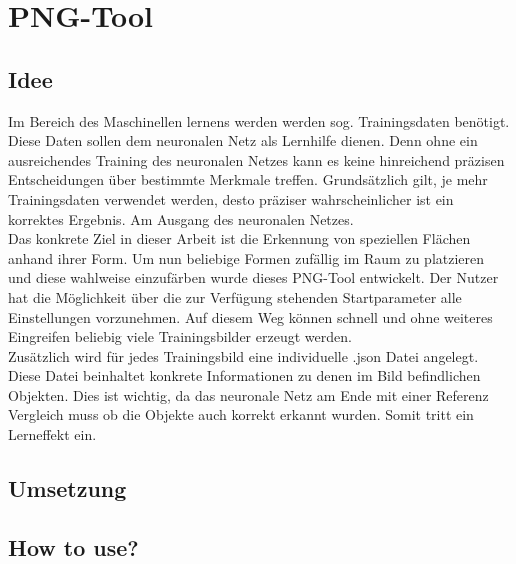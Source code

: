 
\section{PNG-Tool}

\subsection{Idee}

Im Bereich des Maschinellen lernens werden werden sog. Trainingsdaten benötigt. Diese Daten sollen dem neuronalen Netz als Lernhilfe dienen. Denn ohne ein ausreichendes Training des neuronalen Netzes kann es keine hinreichend präzisen Entscheidungen über bestimmte Merkmale treffen.
Grundsätzlich gilt, je mehr Trainingsdaten verwendet werden, desto präziser wahrscheinlicher ist ein korrektes Ergebnis. Am Ausgang des neuronalen Netzes. \\

Das konkrete Ziel in dieser Arbeit ist die Erkennung von speziellen Flächen anhand ihrer Form. Um nun beliebige Formen zufällig im Raum zu platzieren und diese wahlweise einzufärben wurde dieses PNG-Tool entwickelt. Der Nutzer hat die Möglichkeit über die zur Verfügung stehenden Startparameter alle Einstellungen vorzunehmen. Auf diesem Weg können schnell und ohne weiteres Eingreifen beliebig viele Trainingsbilder erzeugt werden. \\

Zusätzlich wird für jedes Trainingsbild eine individuelle .json Datei angelegt. Diese Datei beinhaltet konkrete Informationen zu denen im Bild befindlichen Objekten. Dies ist wichtig, da das neuronale Netz am Ende mit einer Referenz Vergleich muss ob die Objekte auch korrekt erkannt wurden. Somit tritt ein Lerneffekt ein.  
\newpage

\subsection{Umsetzung}



\newpage

\subsection{How to use?}


